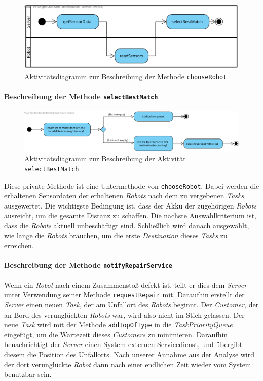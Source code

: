 			\begin{figure}[H]
			\centering
			\includegraphics[width=1\textwidth]{img/1-Analyse-3-Choose_Robot}
			\caption{Aktivitätsdiagramm zur Beschreibung der Methode \texttt{chooseRobot}}
			\label{ChooseRobotActivity}
			\end{figure}			
			
			\paragraph{Beschreibung der Methode \texttt{selectBestMatch}}
			\begin{figure}[H]
			\centering
			\includegraphics[width=1\textwidth]{img/2-Entwurf-SelectBestMatch}
			\caption{Aktivitätsdiagramm zur Beschreibung der Aktivität \texttt{selectBestMatch}}
			\label{SelectBestMatchActivity}
			\end{figure}
			Diese private Methode ist eine Untermethode von \texttt{chooseRobot}. Dabei werden die erhaltenen Sensordaten der erhaltenen \textit{Robots} nach dem zu vergebenen \textit{Tasks} ausgewertet. Die wichtigste Bedingung ist, dass der Akku der zugehörigen \textit{Robots} ausreicht, um die gesamte Distanz zu schaffen. Die nächste Auswahlkriterium ist, dass die \textit{Robots} aktuell unbeschäftigt sind. Schließlich wird danach ausgewählt, wie lange die \textit{Robots} brauchen, um die erste \textit{Destination} dieses \textit{Tasks} zu erreichen.

			\paragraph{Beschreibung der Methode \texttt{notifyRepairService}}
			Wenn ein \textit{Robot} nach einem Zusammenstoß defekt ist, teilt er dies dem \textit{Server} unter Verwendung seiner Methode \texttt{requestRepair} mit.	Daraufhin erstellt der \textit{Server} einen neuen  \textit{Task}, der am Unfallort des \textit{Robots} beginnt. Der \textit{Customer}, der an Bord des verunglückten \textit{Robots} war, wird also nicht im Stich gelassen. Der neue \textit{Task} wird mit der Methode \texttt{addTopOfType} in die \textit{TaskPriorityQueue} eingefügt, um die Wartezeit dieses \textit{Customers} zu minimieren. Daraufhin benachrichtigt der \textit{Server} einen System-externen Servicedienst, und übergibt diesem die Position des Unfallorts. Nach unserer Annahme aus der Analyse wird der dort verunglückte \textit{Robot} dann nach einer endlichen Zeit wieder vom System benutzbar sein.
			
